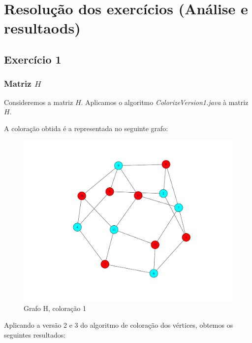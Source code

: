 \documentclass[a4paper,10pt]{report}
\begin{document}
\chapter{Resolução dos exercícios (Análise e resultaods)}

\section{Exercício 1}

\subsection{Matriz $H$}

Consideremos a matriz $H$. Aplicamos o algoritmo \textit{ColorizeVersion1.java} à matriz $H$.

A coloração obtida é a representada no seguinte grafo:

\begin{figure}[H]
    \centering
        \includegraphics[scale=0.25]{img/v1H.pdf}
    \caption{Grafo H, coloração 1}
    \label{fig:v1H}
\end{figure}

Aplicando a versão 2 e 3 do algoritmo de coloração dos vértices, obtemos os seguintes resultados:
\end{document}
